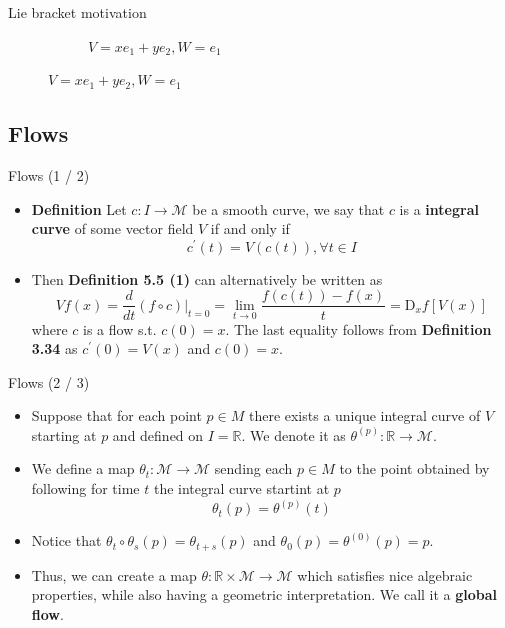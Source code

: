 \documentclass{beamer}
\begin{document}
\begin{frame}{Lie bracket motivation}
\begin{figure}[h!]
\begin{subfigure}{.5\textwidth}
            \caption{$V = xe_1 + ye_2, W=e_1$}
            \label{fig:sub2}
        \end{subfigure}  
    \end{figure}
\end{frame}

\subsection{Flows}
\begin{frame}{Flows (1 / 2)}
    \begin{itemize}
        \item \textbf{Definition} Let $c : I \to \mathcal{M}$ be a smooth curve, we say that $c$ is a {\color{blue}\textbf{integral curve}} of some vector field $V$ if and only if 
        \begin{equation}
            c^\prime (t) = V(c(t)), \forall t \in I
        \end{equation}
        \item Then \textbf{Definition 5.5 (1)} can alternatively be written as 
        \begin{equation}
            Vf(x) = \frac{d}{dt} (f \circ c) \Big|_{t=0} = \lim_{t \to 0 }{\frac{f(c(t)) - f(x)}{t}} = \text{D}_{x}f[V(x)]
        \end{equation}
        where $c$ is a flow s.t. $c(0) = x$. The last equality follows from \textbf{Definition 3.34} as $c^\prime(0) = V(x)$ and $c(0) = x$. 
    \end{itemize}
\end{frame}

\begin{frame}{Flows (2 / 3)}
    \begin{itemize}
        \item Suppose that for each point $p \in M$ there exists a unique integral curve of $V$ starting at $p$ and defined on $I = \mathbb{R}$. We denote it as $\theta^{(p)} : \mathbb{R} \to \mathcal{M}$. 
        \item We define a map $\theta_t : \mathcal{M} \to \mathcal{M}$ sending each $p \in M$ to the point obtained by following for time $t$ the integral curve startint at $p$
        \begin{equation}
            \theta_t(p) = \theta^{(p)}(t)
        \end{equation}
        \item Notice that $\theta_t \circ \theta_s (p) = \theta_{t+s}(p)$ and $\theta_0(p) = \theta^{(0)}(p) = p$. 
        \item Thus, we can create a map $\theta : \mathbb{R} \times \mathcal{M} \to \mathcal{M}$ which satisfies nice algebraic properties, while also having a geometric interpretation. We call it a {\color{blue}\textbf{global flow}}. 
    \end{itemize}
\end{frame}
\end{document}
